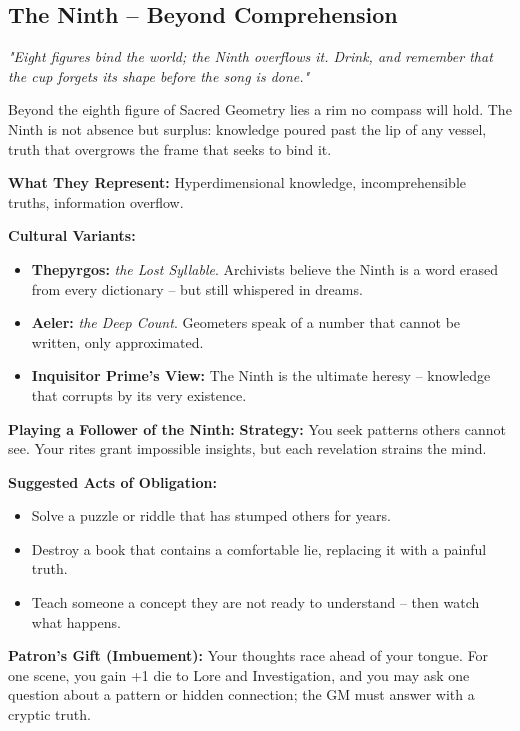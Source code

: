\documentclass[10pt,a5paper]{book}
\begin{document}
\clearpage

\subsection{The Ninth -- Beyond Comprehension}
\label{patron:ninth}

\textit{"Eight figures bind the world; the Ninth overflows it. Drink, and remember that the cup forgets its shape before the song is done."}

Beyond the eighth figure of Sacred Geometry lies a rim no compass will hold. The Ninth is not absence but surplus: knowledge poured past the lip of any vessel, truth that overgrows the frame that seeks to bind it.

\textbf{What They Represent:} Hyperdimensional knowledge, incomprehensible truths, information overflow.

\textbf{Cultural Variants:}
\begin{itemize}
    \item \textbf{Thepyrgos:} \textit{the Lost Syllable}. Archivists believe the Ninth is a word erased from every dictionary -- but still whispered in dreams.
    \item \textbf{Aeler:} \textit{the Deep Count}. Geometers speak of a number that cannot be written, only approximated.
    \item \textbf{Inquisitor Prime's View:} The Ninth is the ultimate heresy -- knowledge that corrupts by its very existence.
\end{itemize}

\textbf{Playing a Follower of the Ninth:}
\textbf{Strategy:} You seek patterns others cannot see. Your rites grant impossible insights, but each revelation strains the mind.

\textbf{Suggested Acts of Obligation:}
\begin{itemize}
    \item Solve a puzzle or riddle that has stumped others for years.
    \item Destroy a book that contains a comfortable lie, replacing it with a painful truth.
    \item Teach someone a concept they are not ready to understand -- then watch what happens.
\end{itemize}

\textbf{Patron's Gift (Imbuement):} Your thoughts race ahead of your tongue. For one scene, you gain +1 die to Lore and Investigation, and you may ask one question about a pattern or hidden connection; the GM must answer with a cryptic truth.
\end{document}
